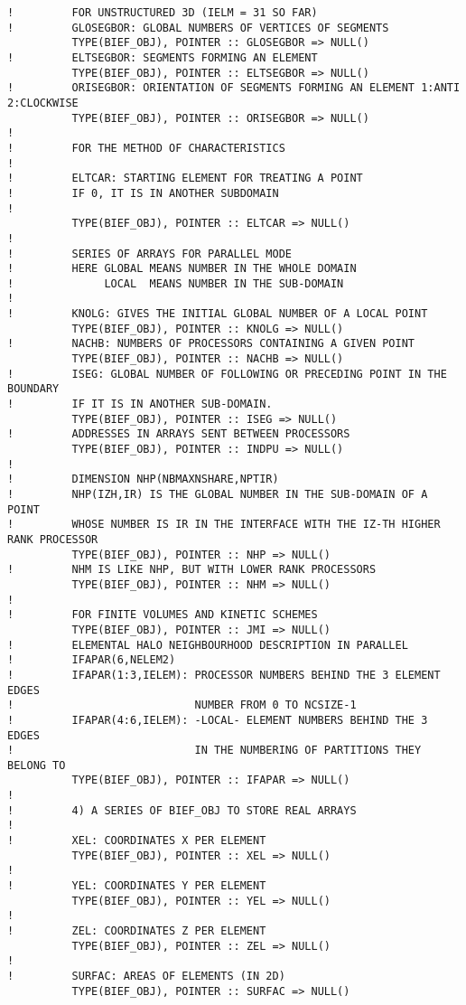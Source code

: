 \begin{lstlisting}[language=TelFortran]
!         FOR UNSTRUCTURED 3D (IELM = 31 SO FAR)
!         GLOSEGBOR: GLOBAL NUMBERS OF VERTICES OF SEGMENTS
          TYPE(BIEF_OBJ), POINTER :: GLOSEGBOR => NULL()
!         ELTSEGBOR: SEGMENTS FORMING AN ELEMENT
          TYPE(BIEF_OBJ), POINTER :: ELTSEGBOR => NULL()
!         ORISEGBOR: ORIENTATION OF SEGMENTS FORMING AN ELEMENT 1:ANTI 2:CLOCKWISE
          TYPE(BIEF_OBJ), POINTER :: ORISEGBOR => NULL()
!
!         FOR THE METHOD OF CHARACTERISTICS
!
!         ELTCAR: STARTING ELEMENT FOR TREATING A POINT
!         IF 0, IT IS IN ANOTHER SUBDOMAIN
!
          TYPE(BIEF_OBJ), POINTER :: ELTCAR => NULL()
!
!         SERIES OF ARRAYS FOR PARALLEL MODE
!         HERE GLOBAL MEANS NUMBER IN THE WHOLE DOMAIN
!              LOCAL  MEANS NUMBER IN THE SUB-DOMAIN
!
!         KNOLG: GIVES THE INITIAL GLOBAL NUMBER OF A LOCAL POINT
          TYPE(BIEF_OBJ), POINTER :: KNOLG => NULL()
!         NACHB: NUMBERS OF PROCESSORS CONTAINING A GIVEN POINT
          TYPE(BIEF_OBJ), POINTER :: NACHB => NULL()
!         ISEG: GLOBAL NUMBER OF FOLLOWING OR PRECEDING POINT IN THE BOUNDARY
!         IF IT IS IN ANOTHER SUB-DOMAIN.
          TYPE(BIEF_OBJ), POINTER :: ISEG => NULL()
!         ADDRESSES IN ARRAYS SENT BETWEEN PROCESSORS
          TYPE(BIEF_OBJ), POINTER :: INDPU => NULL()
!
!         DIMENSION NHP(NBMAXNSHARE,NPTIR)
!         NHP(IZH,IR) IS THE GLOBAL NUMBER IN THE SUB-DOMAIN OF A POINT
!         WHOSE NUMBER IS IR IN THE INTERFACE WITH THE IZ-TH HIGHER RANK PROCESSOR
          TYPE(BIEF_OBJ), POINTER :: NHP => NULL()
!         NHM IS LIKE NHP, BUT WITH LOWER RANK PROCESSORS
          TYPE(BIEF_OBJ), POINTER :: NHM => NULL()
!
!         FOR FINITE VOLUMES AND KINETIC SCHEMES
          TYPE(BIEF_OBJ), POINTER :: JMI => NULL()
!         ELEMENTAL HALO NEIGHBOURHOOD DESCRIPTION IN PARALLEL
!         IFAPAR(6,NELEM2)
!         IFAPAR(1:3,IELEM): PROCESSOR NUMBERS BEHIND THE 3 ELEMENT EDGES
!                            NUMBER FROM 0 TO NCSIZE-1
!         IFAPAR(4:6,IELEM): -LOCAL- ELEMENT NUMBERS BEHIND THE 3 EDGES
!                            IN THE NUMBERING OF PARTITIONS THEY BELONG TO
          TYPE(BIEF_OBJ), POINTER :: IFAPAR => NULL()
!
!         4) A SERIES OF BIEF_OBJ TO STORE REAL ARRAYS
!
!         XEL: COORDINATES X PER ELEMENT
          TYPE(BIEF_OBJ), POINTER :: XEL => NULL()
!
!         YEL: COORDINATES Y PER ELEMENT
          TYPE(BIEF_OBJ), POINTER :: YEL => NULL()
!
!         ZEL: COORDINATES Z PER ELEMENT
          TYPE(BIEF_OBJ), POINTER :: ZEL => NULL()
!
!         SURFAC: AREAS OF ELEMENTS (IN 2D)
          TYPE(BIEF_OBJ), POINTER :: SURFAC => NULL()

\end{lstlisting}
